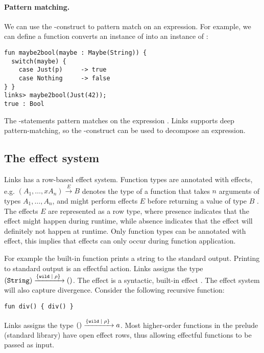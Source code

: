 \paragraph{Pattern matching.} We can use the -construct to pattern match on an expression. For example, we can define a function converts an instance of  into an instance of :
\begin{lstlisting}[style=links]
fun maybe2bool(maybe : Maybe(String)) {
  switch(maybe) {
    case Just(p)     -> true
    case Nothing     -> false
} }
links> maybe2bool(Just(42));
true : Bool
\end{lstlisting}
The -statements pattern matches on the expression . Links supports deep pattern-matching, so the -construct can be used to decompose an expression.

\subsection{The effect system}
Links has a row-based effect system. Function types are annotated with effects, e.g. $(A_1,\dots,xA_n) \xrightarrow{E} B$
denotes the type of a function that takes $n$ arguments of types $A_1,\dots,A_n$, and might perform effects $E$ before returning a value of type $B$ \cite{Links}. The effects $E$ are represented as a row type, where presence indicates that the effect might happen during runtime, while absence indicates that the effect will definitely not happen at runtime. Only function types can be annotated with effect, this implies that effects can only occur during function application.

For example the built-in function  prints a string to the standard output. Printing to standard output is an effectful action. Links assigns  the type $(\texttt{String}) \xrightarrow{\{\texttt{wild} \; | \; \rho\}\;} ()$. The  effect is a syntactic, built-in effect \cite{Links}. The effect system will also capture divergence. Consider the following recursive function:
\begin{lstlisting}[style=links]
fun div() { div() }
\end{lstlisting}
Links assigns  the type $() \xrightarrow{\{\texttt{wild} \; | \; \rho\}\;} a$. Most higher-order functions in the prelude (standard library) have open effect rows, thus allowing effectful functions to be passed as input.


